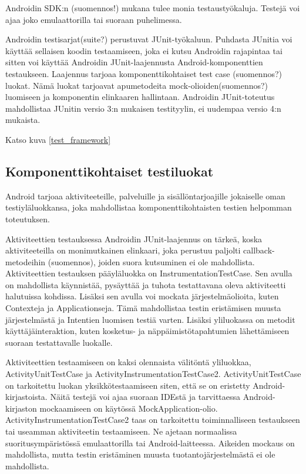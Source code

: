 Androidin SDK:n (suomennos!) mukana tulee monia testaustyökaluja. Testejä voi ajaa joko emulaattorilla tai suoraan puhelimessa.

Androidin testisarjat(suite?) perustuvat JUnit-työkaluun. Puhdasta JUnitia voi käyttää sellaisen koodin testaamiseen, joka ei kutsu Androidin rajapintaa tai sitten voi käyttää Androidin JUnit-laajennusta Android-komponenttien testaukseen. Laajennus tarjoaa komponenttikohtaiset test case (suomennos?) luokat. Nämä luokat tarjoavat apumetodeita mock-olioiden(suomennos?) luomiseen ja komponentin elinkaaren hallintaan. Androidin JUnit-toteutus mahdollistaa JUnitin versio 3:n mukaisen testityylin, ei uudempaa versio 4:n mukaista.\cite{android}

Katso kuva \ref{test_framework}

\subsection{Komponenttikohtaiset testiluokat}

Android tarjoaa aktiviteeteille, palveluille ja sisällöntarjoajille jokaiselle oman testiyläluokkansa, joka mahdollistaa komponenttikohtaisten testien helpomman toteutuksen.

Aktiviteettien testauksessa Androidin JUnit-laajennus on tärkeä, koska aktiviteeteilla on monimutkainen elinkaari, joka perustuu paljolti callback-metodeihin (suomennos), joiden suora kutsuminen ei ole mahdollista. Aktiviteettien testauksen pääyläluokka on InstrumentationTestCase. Sen avulla on mahdollista käynnistää, pysäyttää ja tuhota testattavana oleva aktiviteetti halutuissa kohdissa. Lisäksi sen avulla voi mockata järjestelmäolioita, kuten Contexteja ja Applicationseja. Tämä mahdollistaa testin eristämisen muusta järjestelmästä ja Intentien luomisen testiä varten. Lisäksi yliluokassa on metodit käyttäjäinteraktion, kuten kosketus- ja näppäimistötapahtumien lähettämiseen suoraan testattavalle luokalle.

Aktiviteettien testaamiseen on kaksi olennaista välitöntä yliluokkaa, ActivityUnitTestCase ja ActivityInstrumentationTestCase2. ActivityUnitTestCase on tarkoitettu luokan yksikkötestaamiseen siten, että se on eristetty Android-kirjastoista. Näitä testejä voi ajaa suoraan IDEstä ja tarvittaessa Android-kirjaston mockaamiseen on käytössä MockApplication-olio. ActivityInstrumentationTestCase2 taas on tarkoitettu toiminnalliseen testaukseen tai useamman aktiviteetin testaamiseen. Ne ajetaan normaalissa suoritusympäristössä emulaattorilla tai Android-laitteessa. Aikeiden mockaus on mahdollista, mutta testin eristäminen muusta tuotantojärjestelmästä ei ole mahdollista.

